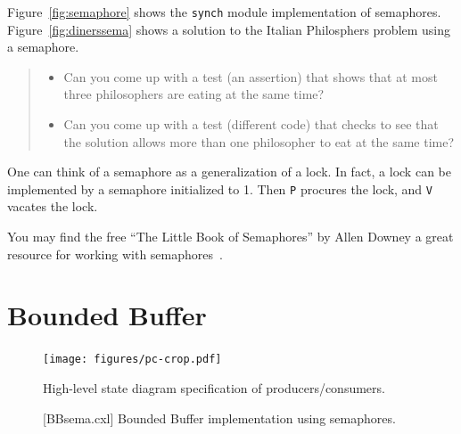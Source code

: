\documentclass{report}
\newenvironment{code}{
\tcolorbox
}{
\endtcolorbox
}
\begin{document}
Figure~\ref{fig:semaphore} shows the \texttt{synch} module implementation of
semaphores.
Figure~\ref{fig:dinerssema} shows a solution to the Italian Philosphers problem
using a semaphore.

\begin{quote}
\begin{itemize}
\item Can you come up with a test (an assertion) that shows that at most three
philosophers are eating at the same time?
\item Can you come up with a test (different code) that checks to see that
the solution allows more than one philosopher to eat at the same time?
\end{itemize}
\end{quote}

One can think of a semaphore as a generalization of a lock.  In fact, a
lock can be implemented by a semaphore initialized to 1.  Then \texttt{P}
procures the lock, and \texttt{V} vacates the lock.

You may find the free ``The Little Book of Semaphores'' by
Allen Downey a great resource for working with semaphores~\cite{Downey09}.

\chapter{Bounded Buffer}
\label{ch:bb}

\begin{figure}
\begin{center}
\texttt{[image: figures/pc-crop.pdf]}
\end{center}
\caption{High-level state diagram specification of producers/consumers.}
\label{fig:pc}
\end{figure}

\begin{figure}
\begin{code}
\end{code}
\caption{[BBsema.cxl] Bounded Buffer implementation using semaphores.}
\label{fig:boundedbuffer}
\end{figure}
\end{document}
